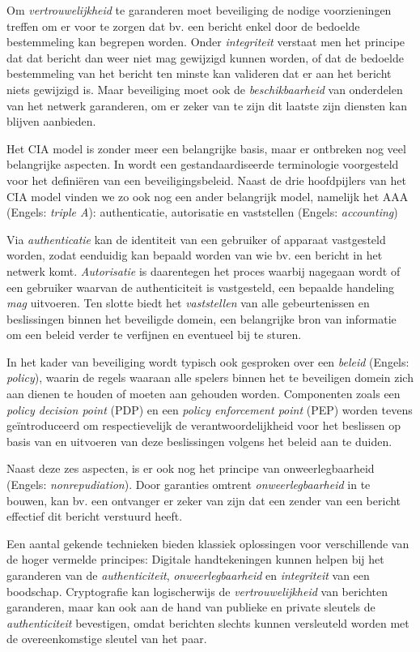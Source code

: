 Om \emph{vertrouwelijkheid} te garanderen moet beveiliging de nodige
voorzieningen treffen om er voor te zorgen dat bv. een bericht enkel door de
bedoelde bestemmeling kan begrepen worden. Onder \emph{integriteit} verstaat
men het principe dat dat bericht dan weer niet mag gewijzigd kunnen worden, of
dat de bedoelde bestemmeling van het bericht ten minste kan valideren dat er
aan het bericht niets gewijzigd is. Maar beveiliging moet ook de
\emph{beschikbaarheid} van onderdelen van het netwerk garanderen, om er zeker
van te zijn dit laatste zijn diensten kan blijven aanbieden.

Het CIA model is zonder meer een belangrijke basis, maar er ontbreken nog veel
belangrijke aspecten. In \cite{rfc:3198} wordt een gestandaardiseerde
terminologie voorgesteld voor het defini\"eren van een beveiligingsbeleid.
Naast de drie hoofdpijlers van het CIA model vinden we zo ook nog een ander
belangrijk model, namelijk het AAA (Engels: \emph{triple A}): authenticatie,
autorisatie en vaststellen (Engels: \emph{accounting})

Via \emph{authenticatie} kan de identiteit van een gebruiker of apparaat
vastgesteld worden, zodat eenduidig kan bepaald worden van wie bv. een bericht
in het netwerk komt. \emph{Autorisatie} is daarentegen het proces waarbij
nagegaan wordt of een gebruiker waarvan de authenticiteit is vastgesteld, een
bepaalde handeling \emph{mag} uitvoeren. Ten slotte biedt het
\emph{vaststellen} van alle gebeurtenissen en beslissingen binnen het
beveiligde domein, een belangrijke bron van informatie om een beleid verder te
verfijnen en eventueel bij te sturen.

In het kader van beveiliging wordt typisch ook gesproken over een \emph{beleid}
(Engels: \emph{policy}), waarin de regels waaraan alle spelers binnen het te
beveiligen domein zich aan dienen te houden of moeten aan gehouden worden.
Componenten zoals een \emph{policy decision point} (PDP) en een \emph{policy
enforcement point} (PEP) worden tevens ge\"introduceerd om respectievelijk de
verantwoordelijkheid voor het beslissen op basis van en uitvoeren van deze
beslissingen volgens het beleid aan te duiden.

Naast deze zes aspecten, is er ook nog het principe van onweerlegbaarheid
(Engels: \emph{nonrepudiation}). Door garanties omtrent
\emph{onweerlegbaarheid} in te bouwen, kan bv. een ontvanger er zeker van zijn
dat een zender van een bericht effectief dit bericht verstuurd heeft.

Een aantal gekende technieken bieden klassiek oplossingen voor verschillende
van de hoger vermelde principes: Digitale handtekeningen kunnen helpen bij het
garanderen van de \emph{authenticiteit}, \emph{onweerlegbaarheid} en
\emph{integriteit} van een boodschap. Cryptografie kan logischerwijs de
\emph{vertrouwelijkheid} van berichten garanderen, maar kan ook aan de hand van
publieke en private sleutels de \emph{authenticiteit} bevestigen, omdat
berichten slechts kunnen versleuteld worden met de overeenkomstige sleutel van
het paar.

